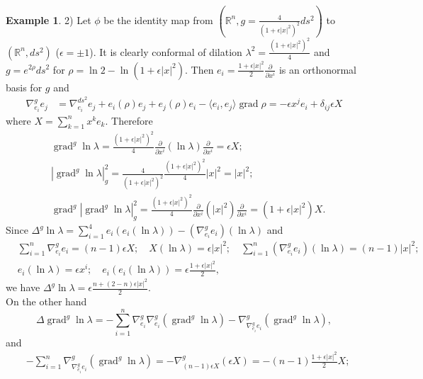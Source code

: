 \documentclass[12pt]{amsart}
\theoremstyle{plain}
\theoremstyle{definition}
\newtheorem{ex}{Example}
\begin{document}
\begin{ex}
2) Let $\phi$ be the identity map from $({{\mathbb R}}^n , g=\tfrac{4}{(1+\epsilon |x|^2)^2}
ds^2)$ to $({{\mathbb R}}^n , ds^2)$ ($\epsilon = \pm 1$). It is clearly conformal of dilation
$\lambda^2 = \tfrac{(1+\epsilon |x|^2)^2}{4}$ and $g = e^{2\rho} ds^2$ for $\rho = \ln 2 - \ln (1+\epsilon |x|^2)$. Then
$e_{i} = \tfrac{1+\epsilon |x|^2}{2}\tfrac{\partial}{\partial x^i}$ is an orthonormal basis for $g$ and
\begin{align*}
\nabla^{g}_{e_{i}}e_{j} &= \nabla^{ds^2}_{e_{i}}e_{j} + e_{i}(\rho)e_{j} + e_{j}(\rho)e_{i} - \langle
e_{i},e_{j} \rangle \operatorname{grad} \rho  = - \epsilon x^j e_{i} + \delta_{ij} \epsilon X
\end{align*}
where $X= \sum_{k=1}^{n} x^k e_k$.
Therefore
\begin{align*}
&\operatorname{grad}^{g} \ln\lambda = \tfrac{(1+\epsilon |x|^2)^2}{4}\tfrac{\partial}{\partial x^i}
(\ln\lambda) \tfrac{\partial}{\partial x^i} =  \epsilon X ;\\
&|\operatorname{grad}^g \ln\lambda|_{g}^{2} = \tfrac{4}{(1+\epsilon |x|^2)^2} \tfrac{(1+\epsilon |x|^2)^2}{4} |x|^2 = |x|^2 ;\\
&\operatorname{grad}^g |\operatorname{grad}^g \ln\lambda|_{g}^{2} =\tfrac{(1+\epsilon |x|^2)^2}{4}
\tfrac{\partial}{\partial x^i} (|x|^2) \tfrac{\partial}{\partial x^i}
=(1+\epsilon |x|^2) X .
\end{align*}
Since $\Delta^{g} \ln\lambda = \sum_{i=1}^{4} e_{i}(e_{i} (\ln\lambda))
-(\nabla^{g}_{e_{i}}e_{i})(\ln\lambda)$ and
\begin{align*}
& \sum_{i=1}^{n} \nabla^{g}_{e_{i}}e_{i} = (n-1) \epsilon X ; \quad  X(\ln \lambda) =
\epsilon |x|^2 ; \quad
\sum_{i=1}^{n} (\nabla^{g}_{e_{i}}e_{i}) (\ln \lambda) = (n-1) |x|^2 ;\\
&e_{i} (\ln\lambda) = \epsilon x^i ;\quad  e_{i}(e_{i} (\ln\lambda)) = \epsilon
\tfrac{1+\epsilon |x|^2}{2} ,
\end{align*}
we have $\Delta^{g} \ln\lambda = \epsilon \tfrac{n + (2-n)\epsilon |x|^2}{2}$.\\
On the other hand
$$\Delta \operatorname{grad}^g \ln\lambda = - \sum_{i=1}^{n} \nabla^{g}_{e_{i}}\nabla^{g}_{e_{i}} (\operatorname{grad}^g \ln\lambda)
 - \nabla^{g}_{\nabla^{g}_{e_{i}}e_{i}} (\operatorname{grad}^g \ln\lambda) , $$
and
\begin{align*}
& - \sum_{i=1}^{n} \nabla^{g}_{\nabla^{g}_{e_{i}}e_{i}} (\operatorname{grad}^g \ln\lambda) = -
\nabla^{g}_{(n-1) \epsilon X} (\epsilon X)
= - (n-1) \tfrac{1+\epsilon |x|^2}{2} X ;\\

\end{align*}
\end{ex}
\end{document}
